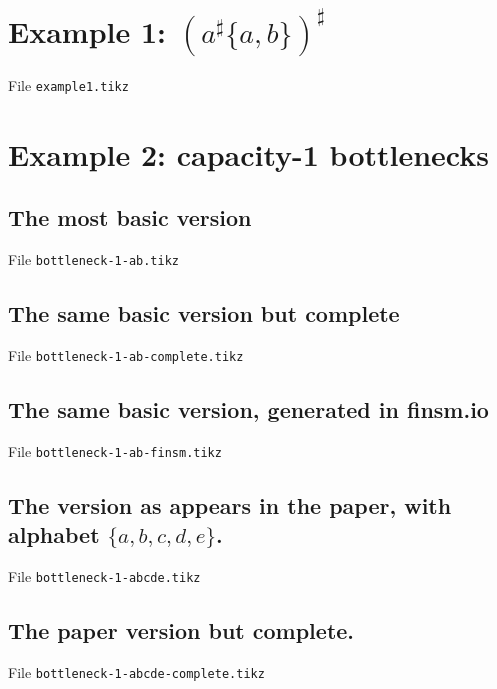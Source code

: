 \documentclass{article}
\begin{document}
\section{Example 1: $(a^\sharp\{a,b\})^\sharp$} 
%
File {\tt example1.tikz}

 



\section{Example 2: capacity-1 bottlenecks}

\subsection{The most basic version}

File {\tt bottleneck-1-ab.tikz}

 

\subsection{The same basic version but complete}

File {\tt bottleneck-1-ab-complete.tikz}

 

\subsection{The same basic version, generated in finsm.io}

File {\tt bottleneck-1-ab-finsm.tikz}

 

\subsection{The version as appears in the paper, with alphabet $\{a,b,c,d,e\}$.}

File {\tt bottleneck-1-abcde.tikz}

 

\subsection{The paper version but complete.}

File {\tt bottleneck-1-abcde-complete.tikz}

 
\end{document}
